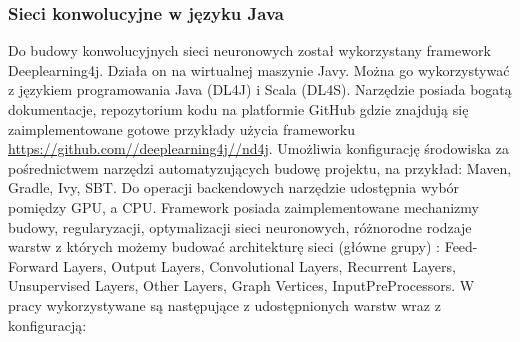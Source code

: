 \documentclass[a4paper,12pt]{article}
\newcommand\spacingIndent{2.2em}
\begin{document}
\subsubsection {Sieci konwolucyjne w języku Java}
        \hspace{\spacingIndent} Do budowy konwolucyjnych sieci neuronowych został wykorzystany framework Deeplearning4j. Działa on na wirtualnej maszynie Javy. 
			Można go wykorzystywać z językiem programowania Java (DL4J) i Scala (DL4S). Narzędzie posiada bogatą dokumentacje, repozytorium kodu na 
			platformie GitHub gdzie znajdują się zaimplementowane gotowe przykłady użycia frameworku 
			\href{https://github.com//deeplearning4j//nd4j}{\url{https://github.com//deeplearning4j//nd4j}}. Umożliwia konfigurację środowiska 
			za pośrednictwem narzędzi automatyzujących budowę projektu, na przykład: Maven, Gradle, Ivy, SBT. Do operacji backendowych narzędzie 
			udostępnia wybór pomiędzy GPU, a CPU. Framework posiada zaimplementowane mechanizmy budowy, regularyzacji, optymalizacji sieci neuronowych, 
			różnorodne rodzaje warstw z których możemy budować architekturę sieci (główne grupy) : Feed-Forward Layers, Output Layers, Convolutional Layers, 
			Recurrent Layers,  Unsupervised Layers, Other Layers, Graph Vertices, InputPreProcessors. 
			W pracy wykorzystywane są następujące z udostępnionych warstw wraz z konfiguracją: 
\end{document}
